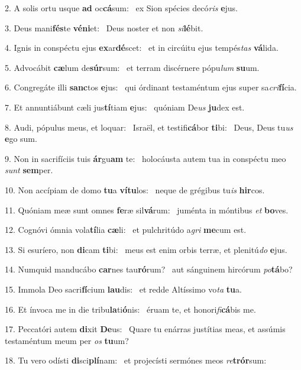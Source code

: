 2. A solis ortu usque \textbf{ad} oc\textbf{cá}sum: \ast\  ex Sion spécies decó\textit{ris} \textbf{e}jus.\

3. Deus mani\textbf{fés}te \textbf{vé}\textbf{ni}et: \ast\  Deus noster et non \textit{si}\textbf{lé}bit.\

4. Ignis in conspéctu ejus \textbf{ex}ar\textbf{dé}scet: \ast\  et in circúitu ejus tempés\textit{tas} \textbf{vá}lida.\

5. Advocábit \textbf{cæ}lum de\textbf{súr}sum: \ast\  et terram discérnere pópu\textit{lum} \textbf{su}um.\

6. Congregáte illi \textbf{sanc}tos \textbf{e}jus: \ast\  qui órdinant testaméntum ejus super sa\textit{cri}\textbf{fí}cia.\

7. Et annuntiábunt cæli jus\textbf{tí}tiam \textbf{e}jus: \ast\  quóniam De\textit{us} \textbf{ju}dex est.\

8. Audi, pópulus meus, et loquar: \dag\  Israël, et testifi\textbf{cá}bor \textbf{ti}bi: \ast\  Deus, Deus tu\textit{us} \textbf{e}go sum.\

9. Non in sacrifíciis tuis \textbf{ár}gu\textbf{am} te: \ast\  holocáusta autem tua in conspéctu meo \textit{sunt} \textbf{sem}per.\

10. Non accípiam de domo \textbf{tu}a \textbf{ví}\textbf{tu}los: \ast\  neque de grégibus tu\textit{is} \textbf{hir}cos.\

11. Quóniam meæ sunt omnes \textbf{fe}ræ sil\textbf{vá}rum: \ast\  juménta in móntibus \textit{et} \textbf{bo}ves.\

12. Cognóvi ómnia vola\textbf{tí}lia \textbf{cæ}li: \ast\  et pulchritúdo a\textit{gri} \textbf{me}cum est.\

13. Si esuríero, non \textbf{di}cam \textbf{ti}bi: \ast\  meus est enim orbis terræ, et plenitú\textit{do} \textbf{e}jus.\

14. Numquid manducábo \textbf{car}nes tau\textbf{ró}rum? \ast\  aut sánguinem hircórum \textit{po}\textbf{tá}bo?\

15. Immola Deo sacri\textbf{fí}cium \textbf{lau}dis: \ast\  et redde Altíssimo vo\textit{ta} \textbf{tu}a.\

16. Et ínvoca me in die tribu\textbf{la}ti\textbf{ó}nis: \ast\  éruam te, et honori\textit{fi}\textbf{cá}bis me.\

17. Peccatóri autem \textbf{di}xit \textbf{De}us: \ast\  Quare tu enárras justítias meas, et assúmis testaméntum meum per \textit{os} \textbf{tu}um?\

18. Tu vero odísti \textbf{di}sci\textbf{plí}nam: \ast\  et projecísti sermónes meos \textit{re}\textbf{trór}sum:\

